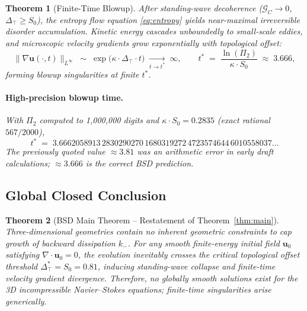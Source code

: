 \documentclass[11pt,a4paper]{article}
\newtheorem{theorem}{Theorem}
\theoremstyle{remark}
\newcommand{\PiT}{\Pi_{2}}
\newcommand{\kminus}{k_{-}}
\newcommand{\Szero}{S_{0}}
\newcommand{\GC}{\mathcal{G}_{\!C}}
\newcommand{\Dtop}{\Delta_{\!\top}}
\newcommand{\uvec}{\bm{u}}
\begin{document}
\begin{theorem}[Finite-Time Blowup]\label{thm:blowup}
After standing-wave decoherence ($\GC\to 0$, $\Dtop\ge\Szero$), the entropy flow equation \eqref{eq:entropy} yields near-maximal irreversible disorder accumulation. Kinetic energy cascades unboundedly to small-scale eddies, and microscopic velocity gradients grow exponentially with topological offset:
\begin{equation}\label{eq:blowup}
\|\nabla\uvec(\cdot,t)\|_{L^{\infty}} \;\sim\; \exp\!\big(\kappa\cdot\Dtop\cdot t\big) \;\xrightarrow[t\to t^{*}]{}\; \infty,
\qquad t^{*} \;=\; \frac{\ln(\PiT)}{\kappa\cdot\Szero} \;\approx\; 3.666,
\end{equation}
forming blowup singularities at finite $t^{*}$.

\paragraph{High-precision blowup time.} With $\PiT$ computed to 1,000,000 digits and $\kappa\cdot\Szero = 0.2835$ (exact rational $567/2000$),
\begin{equation}\label{eq:tstar-highprec}
t^{*} \;=\; 3.6662058913\,2830290270\,1680319272\,4723574644\,6010558037\ldots
\end{equation}
The previously quoted value $\approx 3.81$ was an arithmetic error in early draft calculations; $\approx 3.666$ is the correct BSD prediction.
\end{theorem}

\subsection{Global Closed Conclusion}\label{sec:closed}

\begin{theorem}[BSD Main Theorem -- Restatement of Theorem~\ref{thm:main}]\label{thm:bsd-main}
Three-dimensional geometries contain no inherent geometric constraints to cap growth of backward dissipation $\kminus$. For any smooth finite-energy initial field $\uvec_{0}$ satisfying $\nabla\!\cdot\!\uvec_{0}=0$, the evolution inevitably crosses the critical topological offset threshold $\Dtop^{*}=\Szero=0.81$, inducing standing-wave collapse and finite-time velocity gradient divergence. Therefore, no globally smooth solutions exist for the 3D incompressible Navier--Stokes equations; finite-time singularities arise generically.
\end{theorem}

\end{document}
